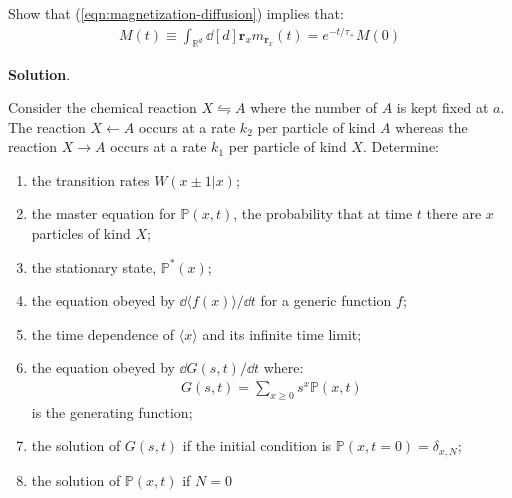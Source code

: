 \documentclass[../../main.tex]{subfiles}
\begin{document}
\begin{exo}
    Show that (\ref{eqn:magnetization-diffusion}) implies that:
    \begin{align*}
        M(t) \equiv \int_{\mathbb{R}^d} \dd[d]{\bm{r}_x} m_{\bm{r}_x}(t) = e^{-t/\tau_+} M(0)
    \end{align*}

    \medskip

    \textbf{Solution}. 
\end{exo}

\begin{exo}
    Consider the chemical reaction $X\leftrightharpoons A$ where the number of $A$ is kept fixed at $a$. The reaction $X \leftarrow A$ occurs at a rate $k_2$ per particle of kind $A$ whereas the reaction $X \rightarrow A$ occurs at a rate $k_1$ per particle of kind $X$. Determine:
    \begin{enumerate}
        \item the transition rates $W(x \pm 1|x)$;
        \item the master equation for $\mathbb{P}(x,t)$, the probability that at time $t$ there are $x$ particles of kind $X$;
        \item the stationary state, $\mathbb{P}^*(x)$;
        \item the equation obeyed by $\dd{\langle f(x) \rangle}/\dd{t}$ for a generic function $f$;
        \item the time dependence of $\langle x \rangle$ and its infinite time limit;
        \item the equation obeyed by $\dd{G(s,t)}/\dd{t}$ where:
        \begin{align*}
            G(s,t) = \sum_{x \geq 0} s^x \mathbb{P}(x,t)
        \end{align*}
        is the generating function;
        \item the solution of $G(s,t)$ if the initial condition is $\mathbb{P}(x,t=0) = \delta_{x,N}$;
        \item the solution of $\mathbb{P}(x,t)$ if $N=0$
    \end{enumerate}
    
\end{exo}
\end{document}
